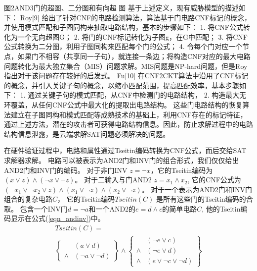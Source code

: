 图2AND3门的超图、二分图和有向超 图
基于上述定义，现有威胁模型的描述如下：
Roy[9]  给出了针对CNF的电路检测算法，算法基于门电路CNF标记的概念，并使用模式匹配和子图同构来抽取电路结构，基本的步骤如下：
1.	将CNF公式转化为一个无向超图G；
2.	将门的CNF标记转化为子图g，在G中匹配；
3.	将CNF公式转换为二分图，利用子图同构来匹配每个门的公式；
4.	令每个门对应一个节点，如果门不相容（共享同一子句），就连接一条边；将构造CNF对应的最大电路问题转化为最大独立集合（MIS）问题求解。MIS问题是NP-hard问题，但是Roy指出对于该问题存在较好的启发式。
Fu[10]  在CNF2CKT算法中沿用了CNF标记的概念，并引入关键子句的概念，以缩小匹配范围，提高匹配效率，基本步骤如下：
1.	通过关键子句的模式匹配，从CNF中检测门的电路结构，
2.	构造最大无环覆盖，从任何CNF公式中最大化的提取出电路结构。
这些门电路结构的恢复算法建立在子图同构和模式匹配等成熟技术的基础上，利用CNF存在的标记特征，通过上述方法，潜在的攻击者可获得电路结构信息。因此，防止求解过程中的电路结构信息泄露，是云端求解SAT问题必须解决的问题。


在硬件验证过程中，电路和属性通过Tseitin编码\cite{Tseitin}转换为CNF公式，而后交给SAT求解器求解。
电路可以被表示为AND2门和INV门的组合形式，我们仅仅给出AND2门和INV门的编码。
对于非门INV $z=\neg x$，它的Tseitin编码为$(x\vee z)\wedge( \neg x\vee \neg z)$。
对于二输入与门AND2 $z=x_1\wedge x_2$,
它的CNF公式为$( \neg x_1\vee \neg x_2\vee z)\wedge(x_1\vee \neg z) \wedge(x_2\vee \neg z)$。
对于一个表示为AND2门和INV门组合的复杂电路$C$，
它的Tseitin编码$Tseitin(C)$ 是所有这些门的Tseitin编码的合取。
包含一个INV门$d=\neg a$和一个AND2的$e=d\wedge c$的简单电路$C$,
他的Tseitin编码显示在公式(\ref{eqn_andinv})中。
\begin{multline}\label{eqn_andinv}
Tseitin(C)=\\
\left\{
\begin{array}{cc}
& (a\vee d) \\
\wedge & (\neg a\vee \neg d)
\end{array}
\right\}\wedge\left\{
\begin{array}{cc}
& (\neg e\vee c) \\
\wedge & (\neg e\vee d) \\
\wedge & (e\vee \neg c\vee\neg d)
\end{array}
\right\}
\end{multline}

